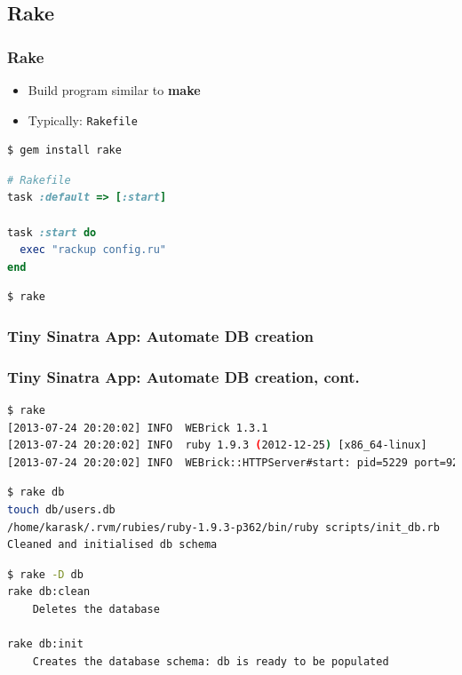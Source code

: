\documentclass{beamer}
\begin{document}
\subsection{Rake}
\begin{frame}[fragile]\frametitle{Rake}

  \begin{itemize}
    \item Build program similar to \textbf{make}
    \item Typically: \texttt{Rakefile}
  \end{itemize}

  \begin{lstlisting}[language=bash, escapechar={^}]
$ gem install rake
  \end{lstlisting}
  
  \begin{lstlisting}[language=ruby, escapechar={^}]
# Rakefile
task :default => [:start]

task :start do
  exec "rackup config.ru"
end
  \end{lstlisting}

  \begin{lstlisting}[language=bash, escapechar={^}]
$ rake
  \end{lstlisting}
  
\end{frame}



\begin{frame}[fragile]\frametitle{Tiny Sinatra App: Automate DB creation}

  

\end{frame}




\begin{frame}[fragile]\frametitle{Tiny Sinatra App: Automate DB creation, cont.}

  \begin{lstlisting}[language=bash, escapechar={^}]
$ rake
[2013-07-24 20:20:02] INFO  WEBrick 1.3.1
[2013-07-24 20:20:02] INFO  ruby 1.9.3 (2012-12-25) [x86_64-linux]
[2013-07-24 20:20:02] INFO  WEBrick::HTTPServer#start: pid=5229 port=9292
  \end{lstlisting}

  \begin{lstlisting}[language=bash, escapechar={^}]
$ rake db
touch db/users.db
/home/karask/.rvm/rubies/ruby-1.9.3-p362/bin/ruby scripts/init_db.rb
Cleaned and initialised db schema
  \end{lstlisting}
  
  \begin{lstlisting}[language=bash, escapechar={^}]
$ rake -D db
rake db:clean
    Deletes the database

rake db:init
    Creates the database schema: db is ready to be populated

  \end{lstlisting}
  
\end{frame}
\end{document}
